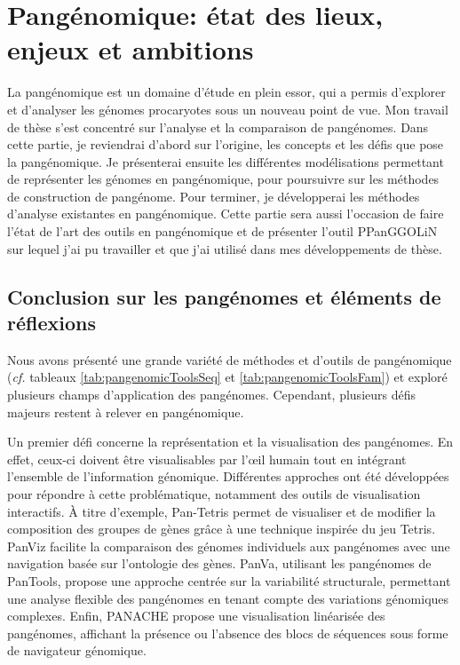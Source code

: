 \chapter{Pangénomique: état des lieux, enjeux et ambitions}

 La pangénomique est un domaine d'étude en plein essor, qui a permis d'explorer et d'analyser les génomes procaryotes sous un nouveau point de vue. Mon travail de thèse s'est concentré sur l'analyse et la comparaison de pangénomes. Dans cette partie, je reviendrai d'abord sur l'origine, les concepts et les défis que pose la pangénomique.  Je présenterai ensuite les différentes modélisations permettant de représenter les génomes en pangénomique, pour poursuivre sur les méthodes de construction de pangénome. Pour terminer, je développerai les méthodes d'analyse existantes en pangénomique. Cette partie sera aussi l'occasion de faire l'état de l'art des outils en pangénomique et de présenter l'outil PPanGGOLiN sur lequel j'ai pu travailler et que j'ai utilisé dans mes développements de thèse.





\newpage
\section{Conclusion sur les pangénomes et éléments de réflexions}

Nous avons présenté une grande variété de méthodes et d'outils de pangénomique (\textit{cf.} tableaux \ref{tab:pangenomicToolsSeq} et \ref{tab:pangenomicToolsFam}) et exploré plusieurs champs d'application des pangénomes. Cependant, plusieurs défis majeurs restent à relever en pangénomique.

Un premier défi concerne la représentation et la visualisation des pangénomes. En effet, ceux-ci doivent être visualisables par l'\oe il humain tout en intégrant l’ensemble de l’information génomique. Différentes approches ont été développées pour répondre à cette problématique, notamment des outils de visualisation interactifs. À titre d’exemple, Pan-Tetris\cite{hennig_pan-tetris_2015} permet de visualiser et de modifier la composition des groupes de gènes grâce à une technique inspirée du jeu Tetris. PanViz\cite{pedersen_panviz_2017} facilite la comparaison des génomes individuels aux pangénomes avec une navigation basée sur l'ontologie des gènes. PanVa\cite{van_den_brandt_panva_2024}, utilisant les pangénomes de PanTools\cite{sheikhizadeh_pantools_2016}, propose une approche centrée sur la variabilité structurale, permettant une analyse flexible des pangénomes en tenant compte des variations génomiques complexes. Enfin, PANACHE\cite{durant_panache_2021} propose une visualisation linéarisée des pangénomes, affichant la présence ou l’absence des blocs de séquences sous forme de navigateur génomique.

